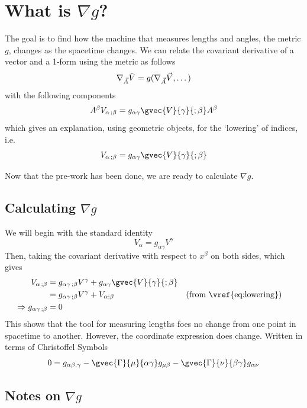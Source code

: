 \section{What is $\nabla g$?}
The goal is to find how the machine that measures lengths and angles, the metric $g$, changes as the spacetime changes. We can relate the covariant derivative of a vector and a 1-form using the metric as follows
$$ \nabla_{\vec{A}} \Tilde{V} = g(\nabla_{\vec{A}} \vec{V}, \dots) $$
with the following components
$$ A^\beta V_{\alpha \, ;\beta}  = g_{\alpha\gamma} \gvec{V}{\gamma}{;\beta}A^\beta $$
which gives an explanation, using geometric objects, for the `lowering' of indices, i.e. 
\begin{equation}
\label{eq:lowering}
    V_{\alpha \,;\beta} = g_{\alpha \gamma} \gvec{V}{\gamma}{;\beta}
\end{equation}
\par Now that the pre-work has been done, we are ready to calculate $\nabla g$.

\subsection{Calculating $\nabla g$}
We will begin with the standard identity
$$ V_\alpha = g_{\alpha \gamma} V^\gamma $$
Then, taking the covariant derivative with respect to $x^\beta$ on both sides, which gives
\begin{align*}
    V_{\alpha \,;\beta} & = g_{\alpha\gamma \,;\beta} V^\gamma + g_{\alpha \gamma} \gvec{V}{\gamma}{;\beta} \\ & = g_{\alpha\gamma \,;\beta} V^\gamma + V_{\alpha ; \beta} && \text{(from \vref{eq:lowering})} \\ 
    \Rightarrow g_{\alpha\gamma \,;\beta} & = 0
\end{align*}
This shows that the tool for measuring lengths foes no change from one point in spacetime to another. However, the coordinate expression does change.
Written in terms of Christoffel Symbols
\begin{equation}
\label{eq:christoffel_g}
    0 = g_{\alpha \beta, \gamma} - \gvec{\Gamma}{\mu}{\alpha \gamma} g_{\mu \beta} - \gvec{\Gamma}{\nu}{\beta \gamma} g_{\alpha \nu}
\end{equation}

\subsection{Notes on $\nabla g$}
